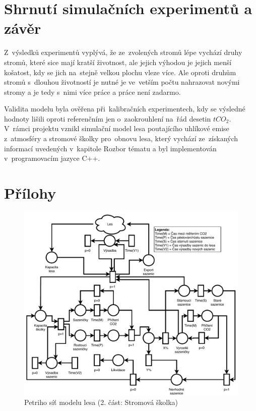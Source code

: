 \documentclass[a4paper, 11pt, titlepage]{article}
\begin{document}
\newpage
\section{Shrnutí simulačních experimentů a závěr} \label{sec:shrnuti_simulacnich_experimentu_a_zaver}

Z~výsledků experimentů vyplývá, že ze~zvolených stromů lépe vychází druhy stromů, které sice mají kratší životnost, ale jejich výhodou je jejich menší košatost, kdy se jich na~stejně velkou plochu vleze více. Ale oproti druhům stromů s~dlouhou životností je nutné je ve~vetším počtu nahrazovat novými stromy a je tedy s~nimi více práce a práce není zadarmo. 

Validita modelu byla ověřena při~kalibračních experimentech, kdy se výsledné hodnoty lišili oproti referenčním jen o~zaokrouhlení na~řád desetin $tCO_2$. 
V~rámci projektu vznikl simulační model lesa poutajícího uhlíkové emise z~atmosféry a stromové školky pro~obnovu lesa, který vychází ze~získaných informací uvedených v~kapitole Rozbor tématu a byl implementován v~programovacím jazyce C++. 


 
\newpage

\renewcommand{\refname}{Literatura a zdroje}


\newpage
\section{Přílohy} \label{sec:prilohy}

\begin{figure}[ht!]
    \centering
    \includegraphics[scale=0.65]{assets/pn_skolka_v2.pdf}
    \caption{Petriho síť modelu lesa (2. část: Stromová školka)}
    \label{fig:pn_nursery}
\end{figure}
\end{document}
